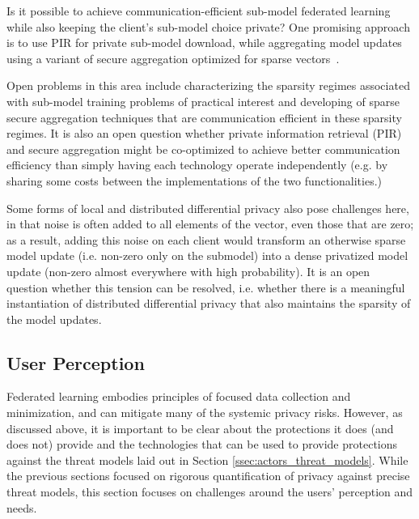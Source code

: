 Is it possible to achieve communication-efficient sub-model federated learning while also keeping the client's sub-model choice private?  One promising approach is to use PIR for private sub-model download, while aggregating model updates using a variant of secure aggregation optimized for sparse vectors~\cite{Chang2019OnTU,Jia2019OnTC,niu2019secure}.

Open problems in this area include characterizing the sparsity regimes associated with sub-model training problems of practical interest and developing of sparse secure aggregation techniques that are communication efficient in these sparsity regimes.  It is also an open question whether private information retrieval (PIR) and secure aggregation might be co-optimized to achieve better communication efficiency than simply having each technology operate independently (e.g. by sharing some costs between the implementations of the two functionalities.)  

Some forms of local and distributed differential privacy also pose challenges here, in that noise is often added to all elements of the vector, even those that are zero; as a result, adding this noise on each client would transform an otherwise sparse model update (i.e. non-zero only on the submodel) into a dense privatized model update (non-zero almost everywhere with high probability).  It is an open question whether this tension can be resolved, i.e. whether there is a meaningful instantiation of distributed differential privacy that also maintains the sparsity of the model updates.

\subsection{User Perception}
\label{ssec:user_perception}

Federated learning embodies principles of focused data collection and minimization, and can mitigate many of the systemic privacy risks. However, as discussed above, it is important to be clear about the protections it does (and does not) provide and the technologies that can be used to provide protections against the threat models laid out in Section \ref{ssec:actors_threat_models}. While the previous sections focused on rigorous quantification of privacy against precise threat models, this section focuses on challenges around the users' perception and needs. 

